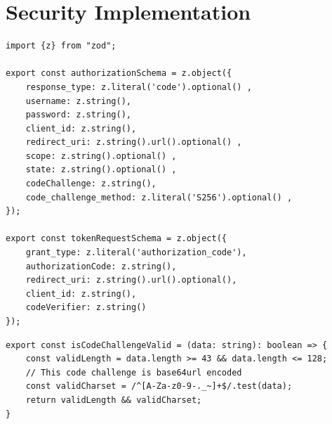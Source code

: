 \appendix
\chapter{Security Implementation}





\begin{lstlisting}[style=typescript,caption=Input Validation,label=apendix:input_val]
import {z} from "zod";

export const authorizationSchema = z.object({
    response_type: z.literal('code').optional() ,
    username: z.string(),
    password: z.string(),
    client_id: z.string(),
    redirect_uri: z.string().url().optional() ,
    scope: z.string().optional() ,
    state: z.string().optional() ,
    codeChallenge: z.string(),
    code_challenge_method: z.literal('S256').optional() ,
});

export const tokenRequestSchema = z.object({
    grant_type: z.literal('authorization_code'),
    authorizationCode: z.string(),
    redirect_uri: z.string().url().optional(),
    client_id: z.string(),
    codeVerifier: z.string()
});

\end{lstlisting}

\newpage
\begin{lstlisting}[style=typescript,caption=Code Challenge Validation,label=apendix:code_chal_val]
export const isCodeChallengeValid = (data: string): boolean => {
    const validLength = data.length >= 43 && data.length <= 128;
    // This code challenge is base64url encoded
    const validCharset = /^[A-Za-z0-9-._~]+$/.test(data);
    return validLength && validCharset;
}
\end{lstlisting}

